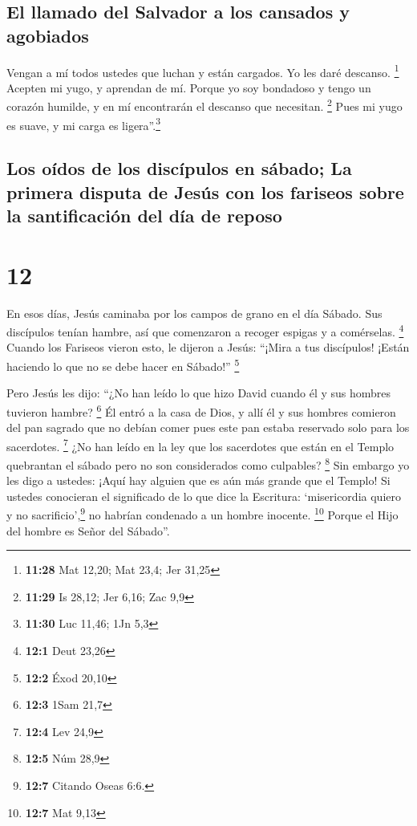 \hypertarget{el-llamado-del-salvador-a-los-cansados-y-agobiados}{%
\subsection{El llamado del Salvador a los cansados
\hspace{0pt}\hspace{0pt}y
agobiados}\label{el-llamado-del-salvador-a-los-cansados-y-agobiados}}

 Vengan a mí todos ustedes que luchan y están cargados.
Yo les daré descanso. \footnote{\textbf{11:28} Mat 12,20; Mat 23,4; Jer
  31,25}  Acepten mi yugo, y aprendan de mí. Porque yo
soy bondadoso y tengo un corazón humilde, y en mí encontrarán el
descanso que necesitan. \footnote{\textbf{11:29} Is 28,12; Jer 6,16; Zac
  9,9}  Pues mi yugo es suave, y mi carga es
ligera''.\footnote{\textbf{11:30} Luc 11,46; 1Jn 5,3}

\hypertarget{los-ouxeddos-de-los-discuxedpulos-en-suxe1bado-la-primera-disputa-de-jesuxfas-con-los-fariseos-sobre-la-santificaciuxf3n-del-duxeda-de-reposo}{%
\subsection{Los oídos de los discípulos en sábado; La primera disputa de
Jesús con los fariseos sobre la santificación del día de
reposo}\label{los-ouxeddos-de-los-discuxedpulos-en-suxe1bado-la-primera-disputa-de-jesuxfas-con-los-fariseos-sobre-la-santificaciuxf3n-del-duxeda-de-reposo}}

\hypertarget{section-11}{%
\section{12}\label{section-11}}

 En esos días, Jesús caminaba por los campos de grano en
el día Sábado. Sus discípulos tenían hambre, así que comenzaron a
recoger espigas y a comérselas. \footnote{\textbf{12:1} Deut 23,26}
 Cuando los Fariseos vieron esto, le dijeron a Jesús:
``¡Mira a tus discípulos! ¡Están haciendo lo que no se debe hacer en
Sábado!'' \footnote{\textbf{12:2} Éxod 20,10}

 Pero Jesús les dijo: ``¿No han leído lo que hizo David
cuando él y sus hombres tuvieron hambre? \footnote{\textbf{12:3} 1Sam
  21,7}  Él entró a la casa de Dios, y allí él y sus
hombres comieron del pan sagrado que no debían comer pues este pan
estaba reservado solo para los sacerdotes. \footnote{\textbf{12:4} Lev
  24,9}  ¿No han leído en la ley que los sacerdotes que
están en el Templo quebrantan el sábado pero no son considerados como
culpables? \footnote{\textbf{12:5} Núm 28,9}  Sin embargo
yo les digo a ustedes: ¡Aquí hay alguien que es aún más grande que el
Templo!  Si ustedes conocieran el significado de lo que
dice la Escritura: `misericordia quiero y no sacrificio',\footnote{\textbf{12:7}
  Citando Oseas 6:6.} no habrían condenado a un hombre inocente.
\footnote{\textbf{12:7} Mat 9,13}  Porque el Hijo del
hombre es Señor del Sábado''.

